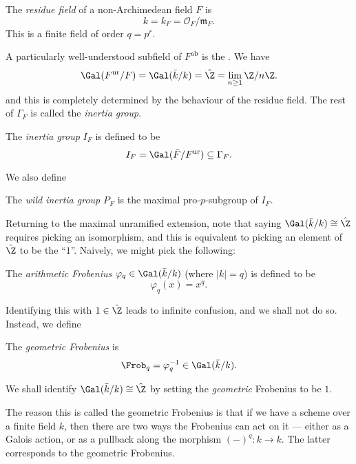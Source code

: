 \documentclass[a4paper]{article}
\newcommand\ab{\mathrm{ab}}
\newcommand\ur{\mathrm{ur}}
\begin{document}
\begin{defi}
  The \emph{residue field} of a non-Archimedean field $F$ is
  \[
    k = k_F = \mathcal{O}_F/\mathfrak{m}_F.
  \]
  This is a finite field of order $q = p^r$.
\end{defi}

A particularly well-understood subfield of $F^{\ab}$ is the  \term{$F^{\ur}$}. We have
\[
  \Gal(F^{\ur}/F) = \Gal(\bar{k}/k) = \hat{\Z} = \lim_{n \geq 1} \Z/n\Z.
\]
and this is completely determined by the behaviour of the residue field. The rest of $\Gamma_F$ is called the \emph{inertia group}.
\begin{defi}
  The \emph{inertia group} $I_F$ is defined to be
  \[
    I_F = \Gal(\bar{F}/F^{\ur}) \subseteq \Gamma_F.
  \]
\end{defi}
We also define
\begin{defi}
  The \emph{wild inertia group} $P_F$ is the maximal pro-$p$-subgroup of $I_F$.
\end{defi}

Returning to the maximal unramified extension, note that saying $\Gal(\bar{k}/k) \cong \hat{\Z}$ requires picking an isomorphism, and this is equivalent to picking an element of $\hat{\Z}$ to be the ``$1$''. Naively, we might pick the following:
\begin{defi}
  The \emph{arithmetic Frobenius} $\varphi_q \in \Gal(\bar{k}/k)$ (where $|k| = q$) is defined to be
  \[
    \varphi_q(x) = x^q.
  \]
\end{defi}

Identifying this with $1 \in \hat{\Z}$ leads to infinite confusion, and we shall not do so. Instead, we define
\begin{defi}
  The \emph{geometric Frobenius} is
  \[
    \Frob_q = \varphi_q^{-1} \in \Gal(\bar{k}/k).
  \]
\end{defi}
We shall identify $\Gal(\bar{k}/k) \cong \hat{\Z}$ by setting the \emph{geometric} Frobenius to be $1$.

The reason this is called the geometric Frobenius is that if we have a scheme over a finite field $k$, then there are two ways the Frobenius can act on it --- either as a Galois action, or as a pullback along the morphism $(-)^q: k \to k$. The latter corresponds to the geometric Frobenius.
\end{document}
